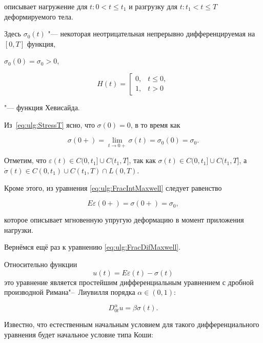 описывает нагружение для $t:0<t\leq t_{1}$ и разгрузку для $t : t_{1} < t \leq T$ деформируемого тела. 

Здесь $\sigma_{0}(t)$ "---  некоторая неотрицательная непрерывно дифференцируемая на $[0, T]$ функция,

$\sigma_{0}(0)=\sigma_{0}>0$,

$$

H(t)=\left[\begin{array}{ll}

0,& t\leq 0,\\

1,& t>0

\end{array}\right.$$

"--- функция Хевисайда.



Из~\eqref{eq:ulg:StressT} ясно, что $\sigma(0)= 0$, в то время как 

$$\sigma(0+)=\lim_{t\to 0+}\sigma(t)=\sigma_{0}(0)=\sigma_{0}.$$ 

Отметим, что $\varepsilon(t) \in C(0,t_{1}]\cup C(t_{1},T]$, так как $\sigma(t) \in C(0,t_{1}]\cup C(t_{1},T]$, а $\dot{\sigma}(t)\in C(0,t_{1})\cup C(t_{1},T)\cap L(0,T)$. 

Кроме этого, из уравнения \eqref{eq:ulg:FracIntMaxwell} следует равенство

\begin{equation}\label{eq:ulg:eps0}

E\varepsilon(0+)=\sigma(0+)=\sigma_{0},

\end{equation}

которое описывает мгновенную упругую деформацию в момент приложения нагрузки.



Вернёмся ещё раз к уравнению \eqref{eq:ulg:FracDifMaxwell}. 

Относительно функции $$u(t)=E\varepsilon(t)-\sigma(t)$$ это уравнение является простейшим дифференциальным уравнением с дробной производной Римана"--~Лиувилля порядка $\alpha\in(0, 1)$:

\begin{equation}\label{eq:ulg:FracDifMaxwellWithU}

D^{\alpha}_{0t}u=\beta\sigma(t).

\end{equation}

Известно, что естественным начальным условием для такого дифференциального уравнения будет начальное условие типа Коши:

